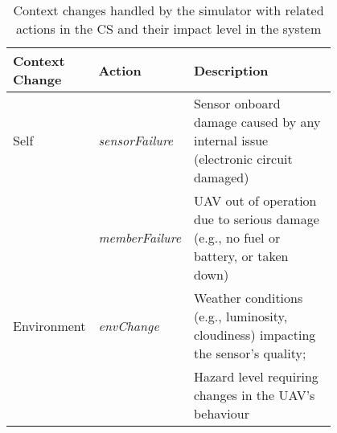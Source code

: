 \begin{table}[ht]
	\small
	\fontsize{10}{10}\selectfont
	\centering
	\caption{Context changes handled by the simulator with related actions in the CS and their impact level in the system}
	\label{table:context_changes}
	
	\begin{tabular}{p{0.15\linewidth}p{0.15\linewidth}p{0.50\linewidth}}
	\hline
		 \textbf{Context Change}
		& \textbf{Action}
		& \textbf{Description}  \\ [2ex]
	\hline	
	Self & \textit{sensorFailure} & Sensor onboard damage caused by any internal issue (electronic circuit damaged) \\[1ex]
	& \textit{memberFailure} & UAV out of operation due to serious damage (e.g., no fuel or battery, or taken down) \\[5ex]
	
	
	Environment & \textit{envChange} & Weather conditions (e.g., luminosity, cloudiness) impacting the sensor's quality; \\[1ex]
	& & Hazard level requiring changes in the UAV's behaviour \\[1ex]
	\hline
	\end{tabular}
\end{table} 
